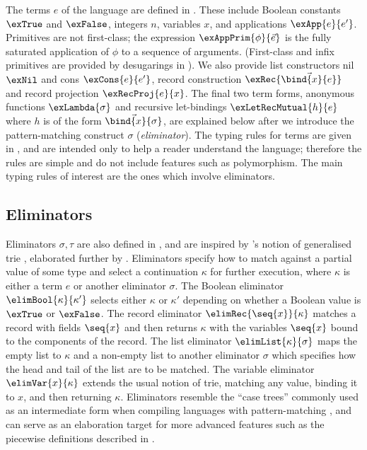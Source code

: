 The terms $e$ of the language are defined in . These include Boolean constants $\exTrue$ and $\exFalse$, integers $n$, variables $x$, and applications $\exApp{e}{e'}$. Primitives are not first-class; the expression $\exAppPrim{\phi}{\vec{e}}$ is the fully saturated application of $\phi$ to a sequence of arguments. (First-class and infix primitives are provided by desugarings in ). We also provide list constructors nil $\exNil$ and cons $\exCons{e}{e'}$, record construction $\exRec{\vec{\bind{x}{e}}}$ and record projection $\exRecProj{e}{x}$. The final two term forms, anonymous functions $\exLambda{\sigma}$ and recursive let-bindings $\exLetRecMutual{h}{e}$ where $h$ is of the form $\vec{\bind{x}{\sigma}}$, are explained below after we introduce the pattern-matching construct $\sigma$ (\emph{eliminator}). The typing rules for terms are given in , and are intended only to help a reader understand the language; therefore the rules are simple and do not include features such as polymorphism. The main typing rules of interest are the ones which involve eliminators.

\subsection{Eliminators}
\label{sec:core-language:syntax-eliminator}

Eliminators $\sigma, \tau$ are also defined in , and are inspired by \citeauthor{connelly95}'s notion of generalised trie \cite{connelly95}, elaborated further by \citet{hinze00}. Eliminators specify how to match against a partial value of some type and select a continuation $\kappa$ for further execution, where $\kappa$ is either a term $e$ or another eliminator $\sigma$. The Boolean eliminator $\elimBool{\kappa}{\kappa'}$ selects either $\kappa$ or $\kappa'$ depending on whether a Boolean value is $\exTrue$ or $\exFalse$. The record eliminator $\elimRec{\seq{x}}{\kappa}$ matches a record with fields $\seq{x}$ and then returns $\kappa$ with the variables $\seq{x}$ bound to the components of the record. The list eliminator $\elimList{\kappa}{\sigma}$ maps the empty list to $\kappa$ and a non-empty list to another eliminator $\sigma$ which specifies how the head and tail of the list are to be matched. The variable eliminator $\elimVar{x}{\kappa}$ extends the usual notion of trie, matching any value, binding it to $x$, and then returning $\kappa$. Eliminators resemble the ``case trees'' commonly used as an intermediate form when compiling languages with pattern-matching \cite{graf20}, and can serve as an elaboration target for more advanced features such as the piecewise definitions described in .

